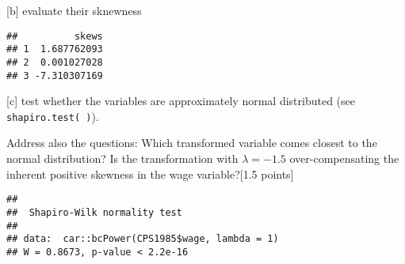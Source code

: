 \documentclass[
]{article}
\newenvironment{Shaded}{\begin{snugshade}}{\end{snugshade}}
\newcommand{\DataTypeTok}[1]{\textcolor[rgb]{0.13,0.29,0.53}{#1}}
\newcommand{\DecValTok}[1]{\textcolor[rgb]{0.00,0.00,0.81}{#1}}
\newcommand{\FloatTok}[1]{\textcolor[rgb]{0.00,0.00,0.81}{#1}}
\newcommand{\KeywordTok}[1]{\textcolor[rgb]{0.13,0.29,0.53}{\textbf{#1}}}
\newcommand{\NormalTok}[1]{#1}
\newcommand{\OperatorTok}[1]{\textcolor[rgb]{0.81,0.36,0.00}{\textbf{#1}}}
\newcommand{\StringTok}[1]{\textcolor[rgb]{0.31,0.60,0.02}{#1}}
\begin{document}
{[}b{]} evaluate their sknewness

\begin{Shaded}
\end{Shaded}

\begin{verbatim}
##          skews
## 1  1.687762093
## 2  0.001027028
## 3 -7.310307169
\end{verbatim}

{[}c{]} test whether the variables are approximately normal distributed
(see \texttt{shapiro.test(\ )}).

Address also the questions: Which transformed variable comes closest to
the normal distribution? Is the transformation with \(\lambda = -1.5\)
over-compensating the inherent positive skewness in the wage
variable?{[}1.5 points{]}

\begin{Shaded}
\end{Shaded}

\begin{verbatim}
## 
##  Shapiro-Wilk normality test
## 
## data:  car::bcPower(CPS1985$wage, lambda = 1)
## W = 0.8673, p-value < 2.2e-16
\end{verbatim}

\begin{Shaded}
\end{Shaded}
\end{document}
